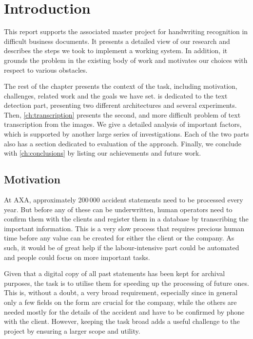 \chapter{Introduction}\label{ch:intro}

This report supports the associated master project for handwriting recognition in difficult business documents. It presents a detailed view of our research and describes the steps we took to implement a working system. In addition, it grounds the problem in the existing body of work and motivates our choices with respect to various obstacles.

The rest of the chapter presents the context of the task, including motivation, challenges, related work and the goals we have set.  is dedicated to the text detection part, presenting two different architectures and several experiments. Then, \autoref{ch:transcription} presents the second, and more difficult problem of text transcription from the images. We give a detailed analysis of important factors, which is supported by another large series of investigations. Each of the two parts also has a section dedicated to evaluation of the approach. Finally, we conclude with \autoref{ch:conclusions} by listing our achievements and future work.


\section{Motivation}
At AXA, approximately 200\,000 accident statements need to be processed every year. But before any of these can be underwritten, human operators need to confirm them with the clients and register them in a database by transcribing the important information. This is a very slow process that requires precious human time before any value can be created for either the client or the company. As such, it would be of great help if the labour-intensive part could be automated and people could focus on more important tasks.

Given that a digital copy of all past statements has been kept for archival purposes, the task is to utilise them for speeding up the processing of future ones. This is, without a doubt, a very broad requirement, especially since in general only a few fields on the form are crucial for the company, while the others are needed mostly for the details of the accident and have to be confirmed by phone with the client. However, keeping the task broad adds a useful challenge to the project by ensuring a larger scope and utility.

